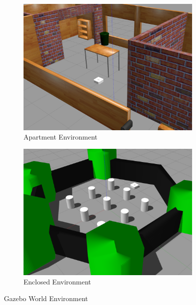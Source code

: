 \documentclass[letterpaper, 10pt, conference]{ieeeconf}
\begin{document}
\begin{figure}[ht]
	\centering
	\begin{subfigure}[b]{0.49\linewidth}
		\centering
		\includegraphics[width=\linewidth]{Figures/house_env.png}
		\caption{Apartment Environment}
		\label{fig:house_gazebo}
	\end{subfigure}
	\hfill
	\begin{subfigure}[b]{0.49\linewidth}
		\centering
		\includegraphics[width=\linewidth]{Figures/world_env.png}
		\caption{Enclosed Environment}
		\label{fig:world_gazebo}
	\end{subfigure}
	\caption{Gazebo World Environment}
	\label{fig:three graphs}
\end{figure}
\end{document}
